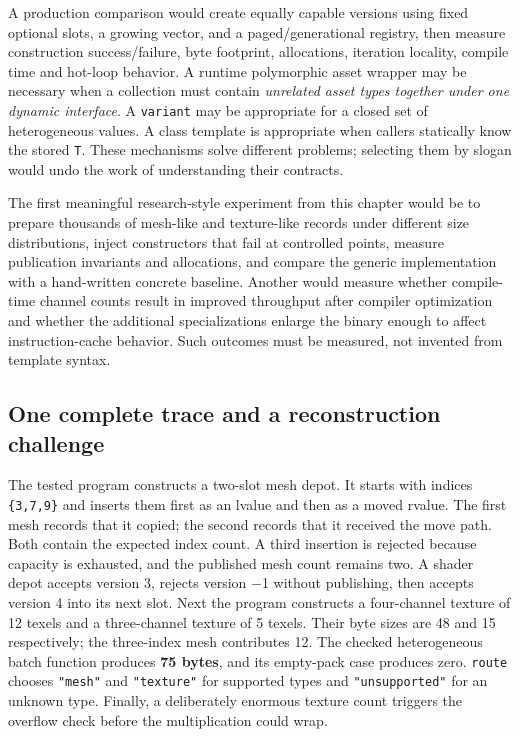 A production comparison would create equally capable versions using fixed optional slots, a growing vector, and a paged/generational registry, then measure construction success/failure, byte footprint, allocations, iteration locality, compile time and hot-loop behavior. A runtime polymorphic asset wrapper may be necessary when a collection must contain \emph{unrelated asset types together under one dynamic interface}. A \texttt{variant} may be appropriate for a closed set of heterogeneous values. A class template is appropriate when callers statically know the stored \texttt{T}. These mechanisms solve different problems; selecting them by slogan would undo the work of understanding their contracts.

The first meaningful research-style experiment from this chapter would be to prepare thousands of mesh-like and texture-like records under different size distributions, inject constructors that fail at controlled points, measure publication invariants and allocations, and compare the generic implementation with a hand-written concrete baseline. Another would measure whether compile-time channel counts result in improved throughput after compiler optimization and whether the additional specializations enlarge the binary enough to affect instruction-cache behavior. Such outcomes must be measured, not invented from template syntax.

\subsection{One complete trace and a reconstruction challenge}\label{05-engine-i-ch005-one-complete-trace-and-a-reconstruction-challenge}

The tested program constructs a two-slot mesh depot. It starts with indices \texttt{\{3,7,9\}} and inserts them first as an lvalue and then as a moved rvalue. The first mesh records that it copied; the second records that it received the move path. Both contain the expected index count. A third insertion is rejected because capacity is exhausted, and the published mesh count remains two. A shader depot accepts version 3, rejects version −1 without publishing, then accepts version 4 into its next slot. Next the program constructs a four-channel texture of 12 texels and a three-channel texture of 5 texels. Their byte sizes are 48 and 15 respectively; the three-index mesh contributes 12. The checked heterogeneous batch function produces \textbf{75 bytes}, and its empty-pack case produces zero. \texttt{route} chooses \texttt{"mesh"} and \texttt{"texture"} for supported types and \texttt{"unsupported"} for an unknown type. Finally, a deliberately enormous texture count triggers the overflow check before the multiplication could wrap.

